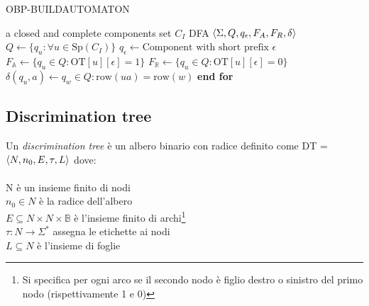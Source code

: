 \begin{algorithm}
\caption{OBP-BUILDAUTOMATON}\label{alg:obp-buildautomaton}
\begin{algorithmic}[1]
\Statex
\Input a closed and complete components set $C_I$
\Output DFA $\Braket{\Sigma,Q,q_\epsilon,F_A,F_R,\delta}$
\State $Q \gets \{q_u :  \forall  u \in \text{Sp}(C_I)\}$
\State $q_\epsilon \gets \text{Component with short prefix } \epsilon $  
\State $F_{\mathbb{A}} \gets \{q_u \in Q : \text{OT}[u][\epsilon] = 1\}$
\State $F_{\mathbb{R}} \gets \{q_u \in Q : \text{OT}[u][\epsilon] = 0\}$
      $\delta(q_u,a) \gets q_w \in Q : \text{row}(ua) = \text{row}(w)$
     \EndFor
\EndFor
\State \textbf{end for}
\State {}
\end{algorithmic}
\end{algorithm}

\subsection{Discrimination tree}
\begin{definizione*}
Un \textit{discrimination tree} è un albero binario con radice definito come \ac{DT} = $\Braket{N,n_0,E,\tau,L}$ dove:\\\\
N è un insieme finito di nodi\\
$n_0 \in N$ è la radice dell'albero\\
$E \subseteq N \times N \times \mathbb{B}$ è l'insieme finito di archi\footnote{Si specifica per ogni arco se il secondo nodo è figlio destro o sinistro del primo nodo (rispettivamente 1 e 0)}\\
$\tau : N \to \Sigma^{*}$ assegna le etichette ai nodi\\
$L \subseteq N$ è l'insieme di foglie 
\end{definizione*}

